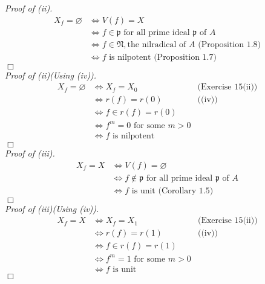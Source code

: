 \documentclass{article}
\begin{document}
\emph{Proof of (ii).}
\begin{align*}
X_f = \varnothing
&\Longleftrightarrow V(f) = X \\
&\Longleftrightarrow f \in \mathfrak{p}
\text{ for all prime ideal $\mathfrak{p}$ of $A$} \\
&\Longleftrightarrow f \in \mathfrak{N},
\text{the nilradical of $A$ (Proposition 1.8)} \\
&\Longleftrightarrow f \text{ is nilpotent (Proposition 1.7)}
\end{align*}
$\Box$ \\

\emph{Proof of (ii)(Using (iv)).}
\begin{align*}
X_f = \varnothing
&\Longleftrightarrow X_f = X_0
  &\text{(Exercise 15(ii))} \\
&\Longleftrightarrow r(f) = r(0)
  &\text{((iv))} \\
&\Longleftrightarrow f \in r(f) = r(0)
  & \\
&\Longleftrightarrow f^m = 0 \text{ for some $m > 0$}
  & \\
&\Longleftrightarrow f \text{ is nilpotent}
  &
\end{align*}
$\Box$ \\

\emph{Proof of (iii).}
\begin{align*}
X_f = X
&\Longleftrightarrow V(f) = \varnothing \\
&\Longleftrightarrow f \not\in \mathfrak{p}
\text{ for all prime ideal $\mathfrak{p}$ of $A$} \\
&\Longleftrightarrow f \text{ is unit (Corollary 1.5)}
\end{align*}
$\Box$ \\

\emph{Proof of (iii)(Using (iv)).}
\begin{align*}
X_f = X
&\Longleftrightarrow X_f = X_1
  &\text{(Exercise 15(ii))} \\
&\Longleftrightarrow r(f) = r(1)
  &\text{((iv))} \\
&\Longleftrightarrow f \in r(f) = r(1)
  & \\
&\Longleftrightarrow f^m = 1 \text{ for some $m > 0$}
  & \\
&\Longleftrightarrow f \text{ is unit}
  &
\end{align*}
$\Box$ \\
\end{document}

